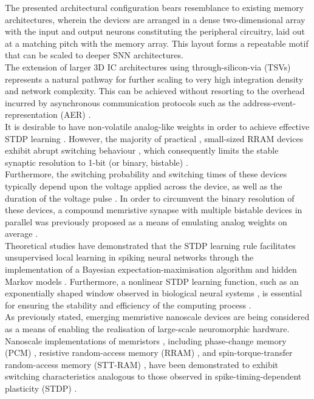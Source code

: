 \noindent The presented architectural configuration bears resemblance to existing memory architectures, wherein the devices are arranged in a dense two-dimensional array with the input and output neurons constituting the peripheral circuitry, laid out at a matching pitch with the memory array. This layout forms a repeatable motif that can be scaled to deeper SNN architectures.\\

\noindent The extension of larger 3D IC architectures using through-silicon-via (TSVs) represents a natural pathway for further scaling to very high integration density and network complexity. This can be achieved without resorting to the overhead incurred by asynchronous communication protocols such as the address-event-representation (AER) \cite{jo2009programmable}.\\

\noindent It is desirable to have non-volatile analog-like weights in order to achieve effective STDP learning \cite{gaba2013stochastic}. However, the majority of practical \cite{soni2011stochastic}, small-sized RRAM devices exhibit abrupt switching behaviour \cite{yu2012switching}, which consequently limits the stable synaptic resolution to 1-bit (or binary, bistable) \cite{suri2013bio}. \\

\noindent Furthermore, the switching probability and switching times of these devices typically depend upon the voltage applied across the device, as well as the duration of the voltage pulse \cite{li2014stochastic}. In order to circumvent the binary resolution of these devices, a compound memristive synapse with multiple bistable devices in parallel was previously proposed as a means of emulating analog weights on average \cite{bill2014compound}.\\

\noindent Theoretical studies have demonstrated that the STDP learning rule facilitates unsupervised local learning in spiking neural networks through the implementation of a Bayesian expectation-maximisation algorithm \cite{nessler2013bayesian} and hidden Markov models \cite{kappel2014stdp}. Furthermore, a nonlinear STDP learning function, such as an exponentially shaped window observed in biological neural systems \cite{toyoizumi2004spike}, is essential for ensuring the stability and efficiency of the computing process \cite{sprekeler2007slowness}. \\

\noindent As previously stated, emerging memristive nanoscale devices are being considered as a means of enabling the realisation of large-scale neuromorphic hardware. Nanoscale implementations of memristors \cite{krzysteczko2012memristive}, including phase-change memory (PCM) \cite{kang2015emulation}, resistive random-access memory (RRAM) \cite{mandal2014novel}, and spin-torque-transfer random-access memory (STT-RAM) \cite{sengupta2015spin}, have been demonstrated to exhibit switching characteristics analogous to those observed in spike-timing-dependent plasticity (STDP) \cite{li2013ultrafast}.\\

